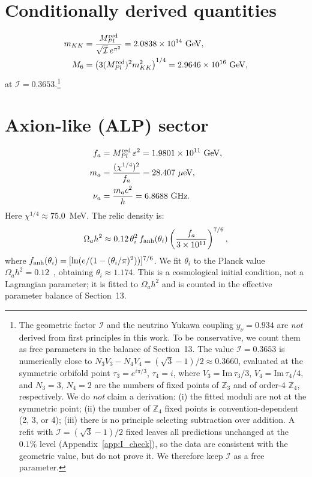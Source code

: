\documentclass[12pt,a4paper]{article}
\numberwithin{equation}{section}
\begin{document}
\section{Conditionally derived quantities}
\begin{align}
m_{KK} &= \frac{M_{Pl}^{\rm red}}{\sqrt{\mathcal{I}}\,e^{\pi^2}} = 2.0838\times10^{14}~\text{GeV}, \\
M_6 &= \left(3 (M_{Pl}^{\rm red})^2 m_{KK}^2\right)^{1/4} = 2.9646\times10^{16}~\text{GeV},
\end{align}
at \(\mathcal{I} = 0.3653\).\footnote{The geometric factor \(\mathcal{I}\) and the neutrino Yukawa coupling \(y_\nu = 0.934\) are \emph{not} derived from first principles in this work. To be conservative, we count them as free parameters in the balance of Section~13. The value \(\mathcal{I} = 0.3653\) is numerically close to \(N_3 V_3 - N_4 V_4 = (\sqrt{3}-1)/2 \approx 0.3660\), evaluated at the symmetric orbifold point \(\tau_3 = e^{i\pi/3}\), \(\tau_4 = i\), where \(V_3 = \mathrm{Im}\,\tau_3/3\), \(V_4 = \mathrm{Im}\,\tau_4/4\), and \(N_3=3\), \(N_4=2\) are the numbers of fixed points of \(\mathbb Z_3\) and of order-4 \(\mathbb Z_4\), respectively. We do \emph{not} claim a derivation: (i) the fitted moduli are not at the symmetric point; (ii) the number of \(\mathbb Z_4\) fixed points is convention-dependent (2, 3, or 4); (iii) there is no principle selecting subtraction over addition. A refit with \(\mathcal I = (\sqrt{3}-1)/2\) fixed leaves all predictions unchanged at the \(0.1\%\) level (Appendix~\ref{app:I_check}), so the data are consistent with the geometric value, but do not prove it. We therefore keep \(\mathcal I\) as a free parameter.}

\section{Axion-like (ALP) sector}
\begin{align}
f_a &= M_{Pl}^{\rm red}\,\varepsilon^2 = 1.9801\times10^{11}~\text{GeV}, \\
m_a &= \frac{(\chi^{1/4})^2}{f_a} = 28.407~\mu\text{eV}, \\
\nu_a &= \frac{m_a c^2}{h} = 6.8688~\text{GHz}.
\end{align}
Here \(\chi^{1/4} \approx 75.0\)~MeV. The relic density is:
\begin{equation}
\Omega_a h^2 \approx 0.12\,\theta_i^2\, f_{\rm anh}(\theta_i)\left(\frac{f_a}{3\times10^{11}}\right)^{7/6},
\end{equation}
where \(f_{\rm anh}(\theta_i) = [\ln(e/(1-(\theta_i/\pi)^2))]^{7/6}\). We fit \(\theta_i\) to the Planck value \(\Omega_a h^2 = 0.12\)~\cite{Planck2018}, obtaining \(\theta_i \approx 1.174\). This is a cosmological initial condition, not a Lagrangian parameter; it is fitted to \(\Omega_a h^2\) and is counted in the effective parameter balance of Section~13.
\end{document}
